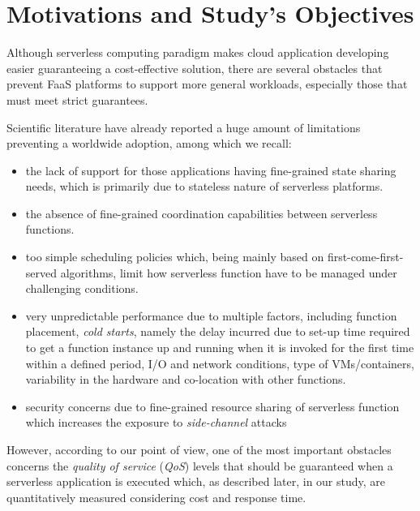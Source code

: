 \documentclass[12pt,a4paper]{report}
\begin{document}
\section{Motivations and Study's Objectives}

Although serverless computing paradigm makes cloud application developing easier guaranteeing a cost-effective solution, there are several obstacles that prevent FaaS platforms to support more general workloads, especially those that must meet strict guarantees.

Scientific literature have already reported a huge amount of limitations preventing a worldwide adoption, among which we recall:

\begin{itemize}
	
	\item the lack of support for those applications having fine-grained state sharing needs, which is primarily due to stateless nature of serverless platforms.
	
	\item the absence of fine-grained coordination capabilities between serverless functions.
	
	\item too simple scheduling policies which, being mainly based on first-come-first-served algorithms, limit how serverless function have to be managed under challenging conditions.
	
	\item very unpredictable performance due to multiple factors, including
	function placement, \textit{cold starts}, namely the delay incurred due to set-up time required to get a function instance up and running when it is invoked for the first time within a defined period, I/O and network conditions, type of VMs/containers, variability in the hardware and co-location with other functions.
	
	\item security concerns due to fine-grained resource sharing of serverless function which increases the exposure to \textit{side-channel} attacks
	
\end{itemize}

However, according to our point of view, one of the most important obstacles concerns the \textit{quality of service} (\textit{QoS}) levels that should be guaranteed when a serverless application is executed which, as described later, in our study, are quantitatively measured considering cost and response time.
\end{document}
